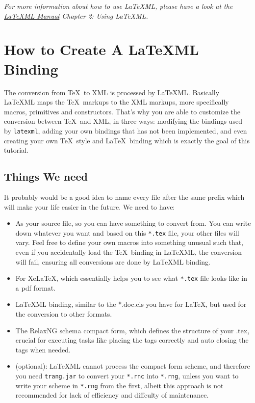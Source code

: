 \documentclass{article}
\begin{document}
\begin{tcolorbox}
\emph{For more information about how to use \LaTeX ML, please have a look at the \href{http://dlmf.nist.gov/LaTeXML/manual.pdf}{\LaTeX ML Manual} Chapter 2: Using \LaTeX ML.}
\end{tcolorbox}

\section{How to Create A LaTeXML Binding}
The conversion from \TeX\  to XML is processed by \LaTeX ML. Basically \LaTeX ML maps the \TeX \ markups to the XML markups, more specifically macros, primitives and constructors. That's why you are able to customize the conversion between \TeX\  and XML, in three ways: modifying the bindings used by \texttt{latexml}, adding your own bindings that has not been implemented, and even creating your own \TeX \ style and \LaTeX\  binding which is exactly the goal of this tutorial.
\subsection{Things We need}
It probably would be a good idea to name every file after the same prefix which will make your life easier in the future. We need to have:
\begin{itemize}
\item[\texttt{*.tex}] As your source file, so you can have something to convert from. You can write down whatever you want and based on this \texttt{*.tex} file, your other files will vary. Feel free to define your own macros into something unusual such that, even if you accidentally load the \TeX\ binding in \LaTeX ML, the conversion will fail, ensuring all conversions are done by \LaTeX ML binding. \\

\item[\texttt{*.cls}] For Xe\LaTeX, which essentially helps you to see what \texttt{*.tex} file looks like in a pdf format. \\ 

\item[\texttt{*.cls.ltxml}] \LaTeX ML binding, similar to the *.doc.cls you have for \LaTeX, but used for the conversion to other formats. \\

\item[\texttt{*.rnc}] The RelaxNG schema compact form, which defines the structure of your .tex, crucial for executing tasks like placing the tags correctly and auto closing the tags when needed. \\

\item[\texttt{trang.jar}](optional): \LaTeX ML cannot process the compact form scheme, and therefore you need \texttt{trang.jar} to convert your \texttt{*.rnc} into \texttt{*.rng}, unless you want to write your scheme in \texttt{*.rng} from the first, albeit this approach is not recommended for lack of efficiency and diffculty of maintenance.
\end{itemize}
\end{document}
